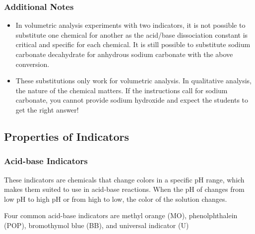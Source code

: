 \subsubsection{Additional Notes}

\begin{itemize}

\item{In volumetric analysis experiments with two indicators, it is not possible to substitute one chemical for another as the acid/base dissociation constant is critical and specific for each chemical. It is still possible to substitute sodium carbonate decahydrate for anhydrous sodium carbonate with the above conversion.}

\item{These substitutions only work for volumetric analysis. In qualitative analysis, the nature of the chemical matters. If the instructions call for sodium carbonate, you cannot provide sodium hydroxide and expect the students to get the right answer!}

\end{itemize}

\subsection{Properties of Indicators}

\subsubsection{Acid-base Indicators}\label{sss:acid-baseind}
These indicators are chemicals that change colors in a specific pH range, which makes them suited to use in acid-base reactions. When the pH of changes from low pH to high pH or from high to low, the color of the solution changes. 

Four common acid-base indicators are methyl orange (MO), phenolphthalein (POP), bromothymol blue (BB), and universal indicator (U)

